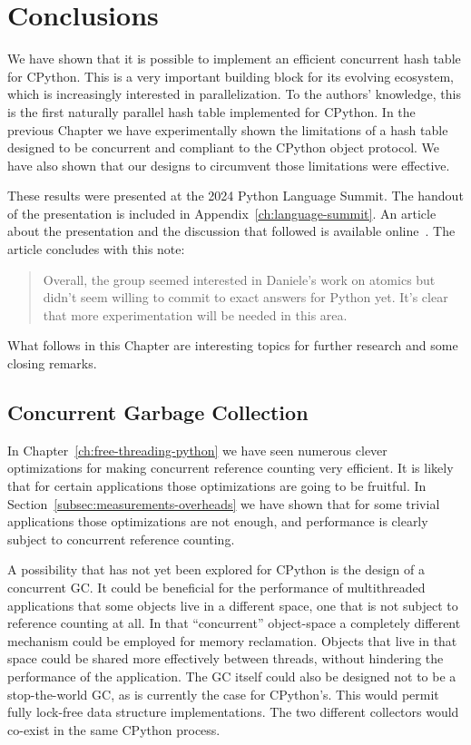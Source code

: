 \chapter{Conclusions}\label{ch:conclusions}

We have shown that it is possible to implement an efficient concurrent hash table for CPython.
This is a very important building block for its evolving ecosystem, which is increasingly interested in parallelization.
To the authors' knowledge, this is the first naturally parallel hash table implemented for CPython.
In the previous Chapter we have experimentally shown the limitations of a hash table designed to be concurrent and compliant to the CPython object protocol.
We have also shown that our designs to circumvent those limitations were effective.

These results were presented at the 2024 Python Language Summit.
The handout of the presentation is included in Appendix~\ref{ch:language-summit}.
An article about the presentation and the discussion that followed is available online~\cite{python-summit-2024-free-threading-ecosystems}.
The article concludes with this note:
\begin{quote}
    Overall, the group seemed interested in Daniele's work on atomics but didn't seem willing to commit to exact answers for Python yet.
    It's clear that more experimentation will be needed in this area.
\end{quote}

What follows in this Chapter are interesting topics for further research and some closing remarks.


\section{Concurrent Garbage Collection}\label{sec:concurrent-garbage-collection}

In Chapter~\ref{ch:free-threading-python} we have seen numerous clever optimizations for making concurrent reference counting very efficient.
It is likely that for certain applications those optimizations are going to be fruitful.
In Section~\ref{subsec:measurements-overheads} we have shown that for some trivial applications those optimizations are not enough, and performance is clearly subject to concurrent reference counting.

A possibility that has not yet been explored for CPython is the design of a concurrent GC\@.
It could be beneficial for the performance of multithreaded applications that some objects live in a different space, one that is not subject to reference counting at all.
In that ``concurrent'' object-space a completely different mechanism could be employed for memory reclamation.
Objects that live in that space could be shared more effectively between threads, without hindering the performance of the application.
The GC itself could also be designed not to be a stop-the-world GC, as is currently the case for CPython's.
This would permit fully lock-free data structure implementations.
The two different collectors would co-exist in the same CPython process.


